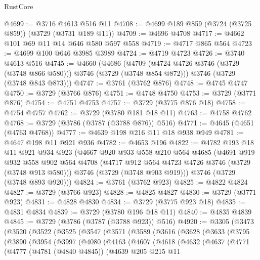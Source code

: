 \begin{lexlean}{RustCore}
\begin{coremodule}
@4699 := @3716 @4613 @516 @11
@4708 := @4699 @189 @859 (@3724 (@3725 @859)) (@3729 (@3731 @189 @11))
@4709 := @4696 @4708
@4717 := @4662 @101 @69 @11 @14 @646 @580 @597 @558
@4719 := @4717 @865 @564
@4723 := @4699 @100 @646 @3985 @3989
@4724 := @4719 @4723
@4726 := @3740 @4613 @516
@4745 := @4660
    (@4686
      (@4709 (@4724 @4726 @3746 (@3729 (@3748 @866 @580))) @3746 (@3729 (@3748 @854 @872)))
      @3746
      (@3729 (@3748 @843 @873)))
@4747 := @3761 (@3762 @876)
@4748 := @4745 @4747
@4750 := @3729 (@3766 @876)
@4751 := @4748 @4750
@4753 := @3729 (@3771 @876)
@4754 := @4751 @4753
@4757 := @3729 (@3775 @876 @18)
@4758 := @4754 @4757
@4762 := @3729 (@3780 @181 @18 @11)
@4763 := @4758 @4762
@4768 := @3729 (@3786 (@3787 (@3788 @876)) @516)
@4771 := @4645 (@4651 (@4763 @4768))
@4777 := @4639 @198 @216 @11 @18 @938 @949
@4781 := @4647 @198 @11 @921 @936
@4782 := @4653 @196
@4822 := @4782
    @193
    @18
    @11
    @921
    @934
    @923
    (@4667
      @920
      @933
      @558
      @210
      @564
      @4685
      (@4691
        @919
        @932
        @558
        @902
        @564
        @4708
        (@4717 @912 @564 @4723 @4726 @3746 (@3729 (@3748 @913 @580)))
        @3746
        (@3729 (@3748 @903 @919)))
      @3746
      (@3729 (@3748 @893 @920)))
@4824 := @3761 (@3762 @923)
@4825 := @4822 @4824
@4827 := @3729 (@3766 @923)
@4828 := @4825 @4827
@4830 := @3729 (@3771 @923)
@4831 := @4828 @4830
@4834 := @3729 (@3775 @923 @18)
@4835 := @4831 @4834
@4839 := @3729 (@3780 @196 @18 @11)
@4840 := @4835 @4839
@4845 := @3729 (@3786 (@3787 (@3788 @923)) @516)
@4920 := @3305
    (@3473
      (@3520
        (@3522
          (@3525
            (@3547
              (@3571
                (@3589
                  (@3616
                    (@3628
                      (@3633
                        (@3795
                          (@3890
                            (@3954
                              (@3997
                                (@4080
                                  (@4163
                                    (@4607
                                      (@4618
                                        (@4632
                                          (@4637
                                            (@4771
                                              (@4777
                                                (@4781 (@4840 @4845))
                                                (@4639
                                                  @205
                                                  @215
                                                  @11

\end{coremodule}
\end{lexlean}
